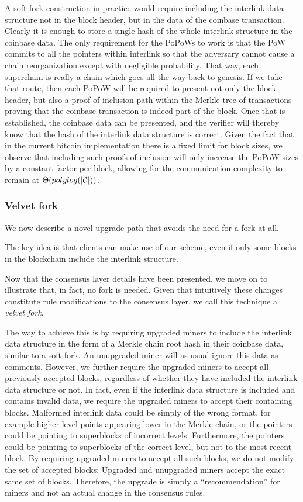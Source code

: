   A soft fork construction in practice would require including the interlink data structure
not in the block header, but in the data of the coinbase transaction.  Clearly
it is enough to store a single hash of the whole interlink structure in the
coinbase data. The only requirement for the PoPoWs to work is that the
PoW commits to all the pointers within interlink so that the adversary cannot
cause a chain reorganization except with negligible probability. That way, each
superchain is really a chain which goes all the way back to genesis. If we take
that route, then each PoPoW will be required to present not only the block
header, but also a proof-of-inclusion path within the Merkle tree of
transactions proving that the coinbase transaction is indeed part of the block.
Once that is established, the coinbase data can be presented, and the verifier
will thereby know that the hash of the interlink data structure is correct.
Given the fact that in the current bitcoin implementation there is a fixed
limit for block sizes, we observe that including such proofs-of-inclusion will
only increase the PoPoW sizes by a constant factor per block, allowing for the
communication complexity to remain at $\Theta(polylog(|\mathcal{C}|))$.


\subsubsection{Velvet fork}
We now describe a novel upgrade path that avoids the need for a fork at all.

The key idea is that clients can make use of our scheme, even if only some blocks in the blockchain include the interlink structure.

Now that the consensus layer details have been presented, we move on to
illustrate that, in fact, no fork is needed. Given that intuitively these
changes constitute rule modifications to the consensus layer, we call this
technique a \textit{velvet fork}.

The way to achieve this is by requiring upgraded miners to include the
interlink data structure in the form of a Merkle chain root hash in their
coinbase data, similar to a soft fork. An unupgraded miner will as usual ignore
this data as comments. However, we further require the upgraded miners to
accept all previously accepted blocks, regardless of whether they have included
the interlink data structure or not. In fact, even if the interlink data
structure is included and contains invalid data, we require the upgraded miners
to accept their containing blocks. Malformed interlink data could be simply of
the wrong format, for example higher-level points appearing lower in the Merkle
chain, or the pointers could be pointing to superblocks of incorrect
levels. Furthermore, the pointers could be pointing to superblocks of the
correct level, but not to the most recent block. By requiring upgraded miners
to accept all such blocks, we do not modify the set of accepted blocks:
Upgraded and unupgraded miners accept the exact same set of blocks. Therefore,
the upgrade is simply a ``recommendation'' for miners and not an actual change in
the consensus rules.

